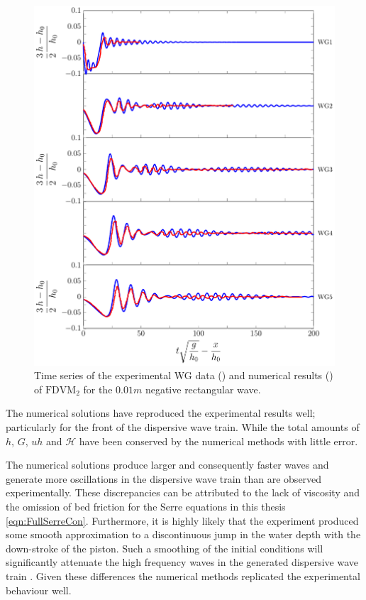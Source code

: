 \begin{figure}
	\centering
	\includegraphics[width=\textwidth]{./chp6/figures/Experiment/Segur/LongWGsFDVM1cm.pdf}
	\caption{Time series of the experimental WG data ({\color{red}\solidrule}) and numerical results ({\color{blue}\solidrule}) of $\text{FDVM}_2$ for the $0.01m$ negative rectangular wave.}
	\label{fig:Segur1cmFDVM}
\end{figure} 

The numerical solutions have reproduced the experimental results well; particularly for the front of the dispersive wave train. While the total amounts of $h$, $G$, $uh$ and $\mathcal{H}$ have been conserved by the numerical methods with little error.

The numerical solutions produce larger and consequently faster waves and generate more oscillations in the dispersive wave train than are observed experimentally. These discrepancies can be attributed to the lack of viscosity and the omission of bed friction for the Serre equations in this thesis \eqref{eqn:FullSerreCon}. Furthermore, it is highly likely that the experiment produced some smooth approximation to a discontinuous jump in the water depth with the down-stroke of the piston. Such a smoothing of the initial conditions will significantly attenuate the high frequency waves in the generated dispersive wave train \cite{Pitt-2018-61}. Given these differences the numerical methods replicated the experimental behaviour well.


